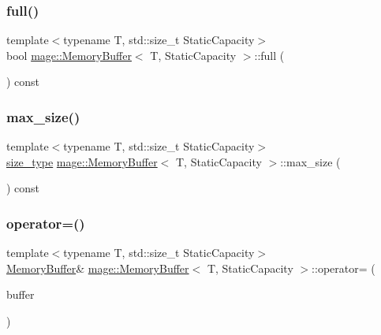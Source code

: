 \subsubsection{\texorpdfstring{full()}{full()}}
{\footnotesize\ttfamily template$<$typename T, std\+::size\+\_\+t Static\+Capacity$>$ \\
bool \mbox{\hyperlink{classmage_1_1_memory_buffer}{mage\+::\+Memory\+Buffer}}$<$ T, Static\+Capacity $>$\+::full (\begin{DoxyParamCaption}{ }\end{DoxyParamCaption}) const\hspace{0.3cm}{\ttfamily [noexcept]}}

\mbox{\label{classmage_1_1_memory_buffer_a2c371f13a0ed5c35f31b4bf857463c49}} 
\subsubsection{\texorpdfstring{max\+\_\+size()}{max\_size()}}
{\footnotesize\ttfamily template$<$typename T, std\+::size\+\_\+t Static\+Capacity$>$ \\
\mbox{\hyperlink{classmage_1_1_memory_buffer_a77b459da2e6f1c57c21467a6eff8e9f9}{size\+\_\+type}} \mbox{\hyperlink{classmage_1_1_memory_buffer}{mage\+::\+Memory\+Buffer}}$<$ T, Static\+Capacity $>$\+::max\+\_\+size (\begin{DoxyParamCaption}{ }\end{DoxyParamCaption}) const\hspace{0.3cm}{\ttfamily [noexcept]}}

\mbox{\label{classmage_1_1_memory_buffer_a6de12a1a38a1fdeecb626c950711c780}} 
\subsubsection{\texorpdfstring{operator=()}{operator=()}\hspace{0.1cm}{\footnotesize\ttfamily [1/2]}}
{\footnotesize\ttfamily template$<$typename T, std\+::size\+\_\+t Static\+Capacity$>$ \\
\mbox{\hyperlink{classmage_1_1_memory_buffer}{Memory\+Buffer}}\& \mbox{\hyperlink{classmage_1_1_memory_buffer}{mage\+::\+Memory\+Buffer}}$<$ T, Static\+Capacity $>$\+::operator= (\begin{DoxyParamCaption}\item[{const \mbox{\hyperlink{classmage_1_1_memory_buffer}{Memory\+Buffer}}$<$ T, Static\+Capacity $>$ \&}]{buffer }\end{DoxyParamCaption})\hspace{0.3cm}{\ttfamily [delete]}}

